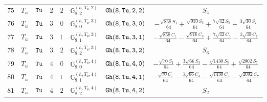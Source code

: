 \documentclass[fleqn,8pt]{jsarticle}
\begin{document}
\begin{table}[ht!]
\begin{center}
\begin{tabular}{cccccccc}
$ 75 $ & $ T_{u} $ & $ {\tt Tu} $ & $ 2 $ & $ 2 $ & $ \mathbb{G}_{8,2}^{(h,T_{u},2)} $ & $ {\tt Gh(8,Tu,2,2)} $ & $ S_{4} $ \\
$ 76 $ & $ T_{u} $ & $ {\tt Tu} $ & $ 3 $ & $ 0 $ & $ \mathbb{G}_{8,0}^{(h,T_{u},3)} $ & $ {\tt Gh(8,Tu,3,0)} $ & $ - \frac{\sqrt{858} S_{1}}{64} + \frac{\sqrt{910} S_{3}}{64} + \frac{7 \sqrt{42} S_{5}}{64} + \frac{3 \sqrt{30} S_{7}}{64} $ \\
$ 77 $ & $ T_{u} $ & $ {\tt Tu} $ & $ 3 $ & $ 1 $ & $ \mathbb{G}_{8,1}^{(h,T_{u},3)} $ & $ {\tt Gh(8,Tu,3,1)} $ & $ - \frac{\sqrt{858} C_{1}}{64} - \frac{\sqrt{910} C_{3}}{64} + \frac{7 \sqrt{42} C_{5}}{64} - \frac{3 \sqrt{30} C_{7}}{64} $ \\
$ 78 $ & $ T_{u} $ & $ {\tt Tu} $ & $ 3 $ & $ 2 $ & $ \mathbb{G}_{8,2}^{(h,T_{u},3)} $ & $ {\tt Gh(8,Tu,3,2)} $ & $ S_{6} $ \\
$ 79 $ & $ T_{u} $ & $ {\tt Tu} $ & $ 4 $ & $ 0 $ & $ \mathbb{G}_{8,0}^{(h,T_{u},4)} $ & $ {\tt Gh(8,Tu,4,0)} $ & $ - \frac{\sqrt{70} S_{1}}{64} + \frac{3 \sqrt{66} S_{3}}{64} - \frac{\sqrt{1430} S_{5}}{64} + \frac{\sqrt{2002} S_{7}}{64} $ \\
$ 80 $ & $ T_{u} $ & $ {\tt Tu} $ & $ 4 $ & $ 1 $ & $ \mathbb{G}_{8,1}^{(h,T_{u},4)} $ & $ {\tt Gh(8,Tu,4,1)} $ & $ - \frac{\sqrt{70} C_{1}}{64} - \frac{3 \sqrt{66} C_{3}}{64} - \frac{\sqrt{1430} C_{5}}{64} - \frac{\sqrt{2002} C_{7}}{64} $ \\
$ 81 $ & $ T_{u} $ & $ {\tt Tu} $ & $ 4 $ & $ 2 $ & $ \mathbb{G}_{8,2}^{(h,T_{u},4)} $ & $ {\tt Gh(8,Tu,4,2)} $ & $ S_{2} $ \\
 \hline \hline
\end{tabular}
\end{center}
\end{table}
\end{document}
